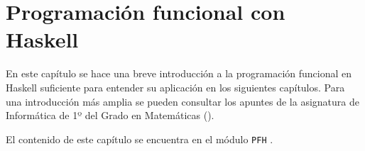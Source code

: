\chapter{Programación funcional con Haskell}\label{sec:progfunHas}

En este capítulo se hace una breve introducción a la programación funcional en
Haskell suficiente para entender su aplicación en los siguientes
capítulos. Para una introducción más amplia se pueden consultar los apuntes de
la asignatura de Informática de 1º del Grado en Matemáticas
(\cite{Alonso-15b}). 

El contenido de este capítulo se encuentra en el módulo \texttt{PFH} 
.

